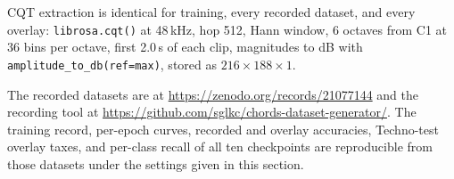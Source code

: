 \documentclass[pdflatex,sn-mathphys-num]{sn-jnl}
\begin{document}
CQT extraction is identical for training, every recorded dataset, and every overlay: \texttt{librosa.cqt()} at 48\,kHz, hop 512, Hann window, 6 octaves from C1 at 36 bins per octave, first 2.0\,s of each clip, magnitudes to dB with \texttt{amplitude\_to\_db(ref=max)}, stored as $216\times188\times1$.

The recorded datasets are at \url{https://zenodo.org/records/21077144} and the recording tool at \url{https://github.com/sglkc/chords-dataset-generator/}. The training record, per-epoch curves, recorded and overlay accuracies, Techno-test overlay taxes, and per-class recall of all ten checkpoints are reproducible from those datasets under the settings given in this section.


\end{document}
